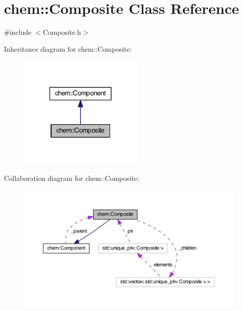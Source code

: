 \hypertarget{classchem_1_1Composite}{\section{chem\-:\-:Composite Class Reference}
\label{classchem_1_1Composite}
}


{\ttfamily \#include $<$Composite.\-h$>$}



Inheritance diagram for chem\-:\-:Composite\-:
\nopagebreak
\begin{figure}[H]
\begin{center}
\leavevmode
\includegraphics[width=172pt]{classchem_1_1Composite__inherit__graph}
\end{center}
\end{figure}


Collaboration diagram for chem\-:\-:Composite\-:\nopagebreak
\begin{figure}[H]
\begin{center}
\leavevmode
\includegraphics[width=350pt]{classchem_1_1Composite__coll__graph}
\end{center}
\end{figure}

